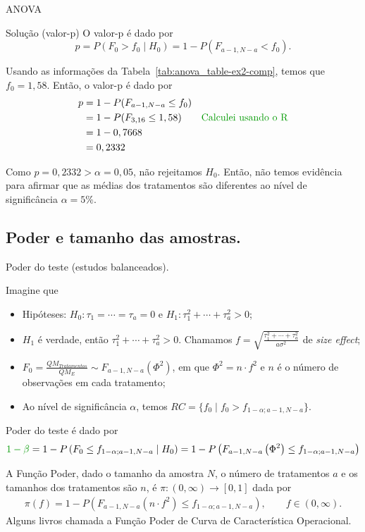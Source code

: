 \documentclass[8pt]{beamer}
\begin{document}
\begin{frame}{ANOVA}
\begin{block}{Solução (valor-p)}
	O valor-p é dado por
	$$p=P(F_0 > f_0 \mid H_0) = 1 - P(F_{a-1, N-a} < f_0).$$
	
	Usando as informações da Tabela~\ref{tab:anova_table-ex2-comp}, temos que $f_0 = 1,58$. Então, o valor-p é dado por
	\begin{align*}
	p &= 1 - P(F_{a-1, N-a} \leq f_0)\\
	&= 1 - P(F_{3, 16} \leq 1,58)\qquad \textcolor{important}{\mbox{Calculei usando o R}}\\
	&= 1 - 0,7668\\
	&=0,2332
	\end{align*}
	
	Como $p=0,2332 > \alpha = 0,05$, não rejeitamos $H_0$. Então, não temos evidência para afirmar que as médias dos tratamentos são diferentes ao nível de significância $\alpha=5\%$.
\end{block}
\end{frame}



\subsection{Poder e tamanho das amostras.}	

\begin{frame}{Poder do teste (estudos balanceados).}


Imagine que
\begin{itemize}
	\item Hipóteses: $H_0: \tau_1=\cdots=\tau_a=0$ e $H_1: \tau_1^2 + \cdots + \tau_a^2 > 0$;
	\item $H_1$ é verdade, então $\tau_1^2 + \cdots + \tau_a^2 > 0$. Chamamos $f = \sqrt{\frac{\tau_1^2 + \cdots + \tau_a^2}{a \sigma^2}}$ de \textit{size effect};
	\item $F_0 = \frac{QM_{Tratamentos}}{QM_E} \sim F_{a-1, N-a}\left(\Phi^2\right)$, em que $\Phi^2 = n \cdot f^2$ e $n$ é o número de observações em cada tratamento;
	\item Ao nível de significância $\alpha$, temos $RC = \{ f_0 \mid f_0 > f_{1-\alpha;a-1, N-a}  \}$.
\end{itemize}

Poder do teste é dado por
\begin{align*}
\textcolor{important}{1-\beta}  = 1 - P\left( F_0 \leq f_{1-\alpha;a-1, N-a} \mid H_0 \right) = 1- P\left( F_{a-1, N-a}\left( \Phi^2 \right) \leq f_{1-\alpha;a-1, N-a}  \right)
\end{align*}

A \textcolor{important}{Função Poder}, dado o tamanho da amostra $N$, o número de tratamentos $a$ e os tamanhos dos tratamentos são $n$, é  $\pi: (0, \infty) \longrightarrow [0,1]$ dada por
\begin{align*}
\pi(f) = 1- P\left( F_{a-1, N-a}\left( n\cdot f^2 \right) \leq f_{1-\alpha;a-1, N-a}  \right), \qquad f \in (0,\infty).
\end{align*}
Alguns livros chamada a Função Poder de \textcolor{important}{Curva de Característica Operacional.}
\end{frame}
\end{document}
